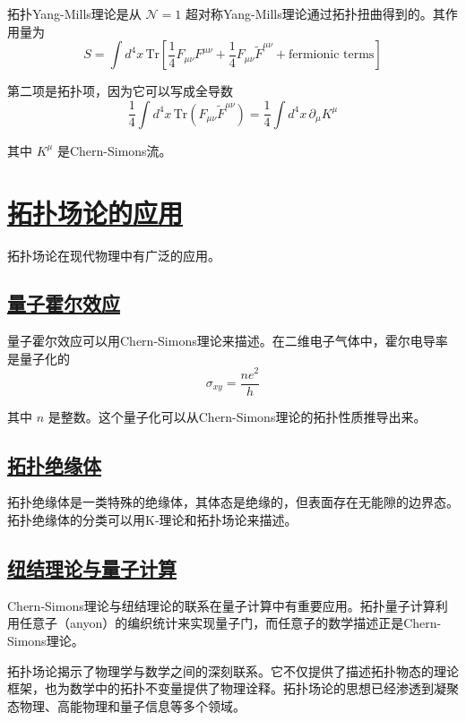 拓扑Yang-Mills理论是从 $\mathcal{N}=1$ 超对称Yang-Mills理论通过拓扑扭曲得到的。其作用量为
\begin{equation}
    S = \int d^4x \, \text{Tr}\left[\frac{1}{4}F_{\mu\nu}F^{\mu\nu} + \frac{1}{4}F_{\mu\nu}\tilde{F}^{\mu\nu} + \text{fermionic terms}\right]
\end{equation}

第二项是拓扑项，因为它可以写成全导数
\begin{equation}
    \frac{1}{4}\int d^4x \, \text{Tr}(F_{\mu\nu}\tilde{F}^{\mu\nu}) = \frac{1}{4}\int d^4x \, \partial_\mu K^\mu
\end{equation}

其中 $K^\mu$ 是Chern-Simons流。

\section{\protect\hyperlink{:}{拓扑场论的应用}}

拓扑场论在现代物理中有广泛的应用。

\subsection{\protect\hyperlink{:}{量子霍尔效应}}

量子霍尔效应可以用Chern-Simons理论来描述。在二维电子气体中，霍尔电导率是量子化的
\begin{equation}
    \sigma_{xy} = \frac{ne^2}{h}
\end{equation}

其中 $n$ 是整数。这个量子化可以从Chern-Simons理论的拓扑性质推导出来。

\subsection{\protect\hyperlink{:}{拓扑绝缘体}}

拓扑绝缘体是一类特殊的绝缘体，其体态是绝缘的，但表面存在无能隙的边界态。拓扑绝缘体的分类可以用K-理论和拓扑场论来描述。

\subsection{\protect\hyperlink{:}{纽结理论与量子计算}}

Chern-Simons理论与纽结理论的联系在量子计算中有重要应用。拓扑量子计算利用任意子（anyon）的编织统计来实现量子门，而任意子的数学描述正是Chern-Simons理论。

\begin{remark}
    拓扑场论揭示了物理学与数学之间的深刻联系。它不仅提供了描述拓扑物态的理论框架，也为数学中的拓扑不变量提供了物理诠释。拓扑场论的思想已经渗透到凝聚态物理、高能物理和量子信息等多个领域。
\end{remark}
